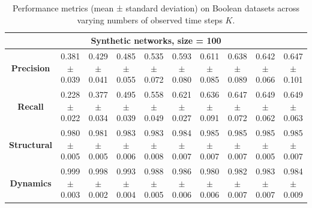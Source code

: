 \begin{table}[h!]
\begin{tabular}{|c|c|c|c|c|c|c|c|c|c|}
\hline
\multicolumn{10}{|c|}{\textbf{Synthetic networks, size = 100}} \\
\hline
\textbf{Precision} & \makecell{0.381\\$\pm$0.039} & \makecell{0.429\\$\pm$0.041} & \makecell{0.485\\$\pm$0.055} & \makecell{0.535\\$\pm$0.072} & \makecell{0.593\\$\pm$0.080} & \makecell{0.611\\$\pm$0.085} & \makecell{0.638\\$\pm$0.089} & \makecell{0.642\\$\pm$0.066} & \makecell{0.647\\$\pm$0.101} \\
\textbf{Recall} & \makecell{0.228\\$\pm$0.022} & \makecell{0.377\\$\pm$0.034} & \makecell{0.495\\$\pm$0.039} & \makecell{0.558\\$\pm$0.049} & \makecell{0.621\\$\pm$0.027} & \makecell{0.636\\$\pm$0.091} & \makecell{0.647\\$\pm$0.072} & \makecell{0.649\\$\pm$0.062} & \makecell{0.649\\$\pm$0.063} \\
\textbf{Structural} & \makecell{0.980\\$\pm$0.005} & \makecell{0.981\\$\pm$0.005} & \makecell{0.983\\$\pm$0.006} & \makecell{0.983\\$\pm$0.008} & \makecell{0.984\\$\pm$0.007} & \makecell{0.985\\$\pm$0.007} & \makecell{0.985\\$\pm$0.007} & \makecell{0.985\\$\pm$0.005} & \makecell{0.985\\$\pm$0.007} \\
\textbf{Dynamics} & \makecell{0.999\\$\pm$0.003} & \makecell{0.998\\$\pm$0.002} & \makecell{0.993\\$\pm$0.004} & \makecell{0.988\\$\pm$0.005} & \makecell{0.986\\$\pm$0.006} & \makecell{0.980\\$\pm$0.006} & \makecell{0.982\\$\pm$0.007} & \makecell{0.983\\$\pm$0.007} & \makecell{0.984\\$\pm$0.009} \\
\hline
\end{tabular}
\caption{Performance metrics (mean ± standard deviation) on Boolean datasets across varying numbers of observed time steps \(K\).}
\label{tab:performance-updated-latest}
\end{table}
